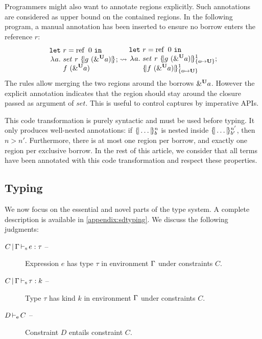 Programmers might also want to annotate regions explicitly.
Such annotations are considered as
upper bound on the contained regions.
In the following program, a manual annotation has been inserted to ensure
no borrow enters the reference $r$:
%
\[
  \setlength{\jot}{-1pt}
  \RannotT{
\begin{aligned}
  \letin{&r}{\operatorname{ref}\ 0}{}\\
  \lam{a}{}\ &
  set\ r\ \region[]{}{g\ (\borrow[\kun]{a})};\\
  &f\ (\borrow[\kun]{a})
\end{aligned}
}{
\begin{aligned}
  \letin{&r}{\operatorname{ref}\ 0}{}\\
  \lam{a}{}\ &
  set\ r\ \region[1]{\Sone a\IBORROW}{g\ (\borrow[\kun]{a})};\\
  &\region[1]{\Sone a\IBORROW}{f\ (\borrow[\kun]{a})}
\end{aligned}
}
\]
%
The rules allow merging the two regions around the borrows
$\borrow[\kun]{a}$. However
the explicit annotation indicates that the region should stay around the closure
passed as argument of $set$. This is useful to control captures
by imperative APIs.

This code transformation is purely syntactic and must be used before
typing. It only produces well-nested annotations: if $\region[n]{b}{\dots}$
is nested inside $\region[n']{b'}{\dots}$, then $n > n'$. Furthermore, there
is at most one region per borrow, and exactly one region per exclusive borrow.
In the rest of this article, we consider
that all terms have been annotated with this code transformation and respect
these properties.

\subsection{Typing}
\label{sdtyping}

We now focus on the essential and novel parts of the type system. A complete
description is available in \cref{appendix:sdtyping}.
%
We discuss the following judgments:
\begin{description}
\item[$\inferS{C}{\E}{e}{\tau}$ --]
  Expression $e$ has type $\tau$ in environment $\E$ under constraints $C$.
\item[$\inferSK{C}{\E}{\tau}{k}$ --]
  Type $\tau$ has kind $k$ in environment $\E$ under constraints $C$.
\item[$\entail{D}{C}$ --] Constraint $D$ entails constraint $C$.
\end{description}

